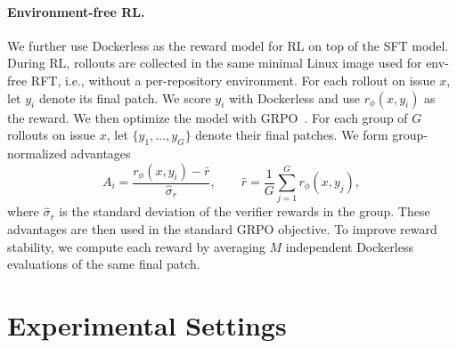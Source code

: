 \documentclass[]{arxiv_template}
\newcommand{\approach}{Dockerless\xspace}
\newcommand{\zeng}[1]{\textcolor[rgb]{1,0.66,0}{\textbf{[Zeng: #1]}}}
\begin{document}
\paragraph{Environment-free RL.}
We further use \approach as the reward model for RL on top of the SFT model. During RL, rollouts are collected in the same minimal Linux image used for env-free RFT, i.e., without a per-repository environment.
For each rollout on issue \(x\), let \(y_i\) denote its final patch. We score \(y_i\) with \approach and use \(r_\phi(x,y_i)\) as the reward.
We then optimize the model with GRPO~\citep{shao2024deepseekmath}. For each group of $G$ rollouts on issue $x$, let \(\{y_1,\dots,y_G\}\) denote their final patches. We form group-normalized advantages
\begin{equation}
  A_i = \frac{r_\phi(x, y_i) - \bar{r}}{\hat{\sigma}_r}, \qquad \bar{r} = \frac{1}{G}\sum_{j=1}^G r_\phi(x, y_j),
  \label{eq:grpo-advantage}
\end{equation}
where \(\hat{\sigma}_r\) is the standard deviation of the verifier rewards in the group. These advantages are then used in the standard GRPO objective.
To improve reward stability, we compute each reward by averaging \(M\) independent \approach evaluations of the same final patch.



\section{Experimental Settings}
\label{sec:setup}
\end{document}
